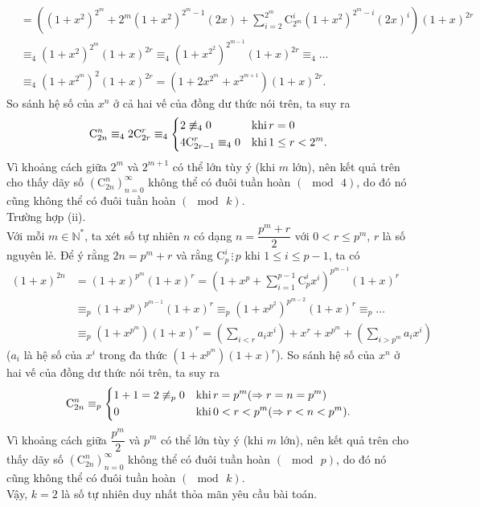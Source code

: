 \begin{bt}
{\begin{align*}
		&=\left(\left(1+x^2\right)^{2^m}+2^m\left(1+x^2\right)^{2^m-1}(2x)+ \sum\limits_{i=2}^{2^m}\mathrm{C}_{2^m}^i\left(1+x^2\right)^{2^m-i}(2x)^i \right)(1+x)^{2r}\\
		&\equiv_4 \left(1+x^2\right)^{2^m}(1+x)^{2r}\equiv_4 \left(1+x^{2^2}\right)^{2^{m-1}}(1+x)^{2r}\equiv_4 \ldots \\
		&\equiv_4 (1+x^{2^m})^2(1+x)^{2r} = \left(1+2x^{2^m}+x^{2^{m+1}}\right)(1+x)^{2r}.
		\end{align*}
		So sánh hệ số của $x^n$ ở cả hai vế của đồng dư thức nói trên, ta suy ra
		\begin{align*}
		\mathrm{C}_{2n}^n\equiv_4 2\mathrm{C}_{2r}^r\equiv_4 \left\{\begin{aligned}&2\not\equiv_4 0 &&\text{khi}\,r=0\\&4\mathrm{C}_{2r-1}^r\equiv_4 0&&\text{khi}\,1\le r<2^m.\end{aligned}\right.
		\end{align*}
		Vì khoảng cách giữa $2^m$ và $2^{m+1}$ có thể lớn tùy ý (khi $m$ lớn), nên kết quả trên cho thấy dãy số $\left(\mathrm{C}_{2n}^n\right)_{n=0}^{\infty}$ không thể có đuôi tuần hoàn $(\mod\,4)$, do đó nó cũng không thể có đuôi tuần hoàn $(\mod\, k)$.\\
		Trường hợp (ii).\\
		Với mỗi $m\in\mathbb{N}^*$, ta xét số tự nhiên $n$ có dạng $n=\dfrac{p^m+r}{2}$ với $0<r\le p^m$, $r$ là số nguyên lẻ. Để ý rằng $2n=p^m + r$ và rằng $\mathrm{C}_p^i\, \vdots \,p$ khi $1\le i\le p-1$, ta có
		\begin{align*}
		(1+x)^{2n}&=(1+x)^{p^m}(1+x)^r=\left(1+x^p +\sum\limits_{i=1}^{p-1}\mathrm{C}_p^ix^i \right)^{p^{m-1}}(1+x)^r\\
		&\equiv_p (1+x^p)^{p^{m-1}}(1+x)^r\equiv_p \left(1+x^{p^2}\right)^{p^{m-2}}(1+x)^r\equiv_p \ldots \\
		&\equiv_p \left(1+x^{p^m}\right)(1+x)^r=\left(\sum\limits_{i<r}a_ix^i  \right)+x^r +x^{p^m}+\left(\sum\limits_{i>p^m}a_ix^i \right)
		\end{align*}
		($a_i$ là hệ số của $x^i$ trong đa thức $\left(1+x^{p^m}\right)(1+x)^r$). So sánh hệ số của $x^n$ ở hai vế của đồng dư thức nói trên, ta suy ra
		\[\mathrm{C}_{2n}^n\equiv_p \left\{\begin{aligned}&1+1=2\not\equiv_p 0 &&\text{khi}\,r=p^m (\Rightarrow r=n=p^m)\\&0 &&\text{khi}\, 0<r<p^m (\Rightarrow r<n<p^m).\end{aligned}\right. \]
		Vì khoảng cách giữa $\dfrac{p^m}{2}$ và $p^m$ có thể lớn tùy ý (khi $m$ lớn), nên kết quả trên cho thấy dãy số $\left(\mathrm{C}_{2n}^n\right)_{n=0}^{\infty}$ không thể có đuôi tuần hoàn $(\mod\,p)$, do đó nó cũng không thể có đuôi tuần hoàn $(\mod\, k)$.\\
		Vậy, $k=2$ là số tự nhiên duy nhất thỏa mãn yêu cầu bài toán.
	}
\end{bt}


